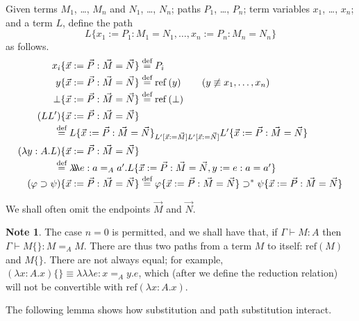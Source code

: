 \documentclass[a4paper,UKenglish]{lipics-v2016}
\newcommand*{\eqdef}{\mathrel{\smash{\stackrel{\text{def}}{=}}}}
\newcommand*{\reff}[1]{\ensuremath{\mathrm{ref} \left( {#1} \right)}}
\newcommand*{\triplelambda}{\ensuremath{\lambda \!\! \lambda \!\! \lambda}}
\theoremstyle{plain}
\theoremstyle{definition}
\newtheorem{note}[theorem]{Note}
\begin{document}
\begin{definition}
Given terms $M_1$, \ldots, $M_n$ and $N_1$, \ldots, $N_n$; paths $P_1$, \ldots, $P_n$; term variables $x_1$, \ldots, $x_n$; and a term $L$, define the path $$L \{ x_1 := P_1 : M_1 = N_1 , \ldots, x_n := P_n : M_n = N_n \}$$ as follows.
\begin{align*}
x_i \{ \vec{x} := \vec{P} : \vec{M} = \vec{N} \} & \eqdef P_i \\
y \{ \vec{x} := \vec{P} : \vec{M} = \vec{N} \} & \eqdef \reff{y} \qquad (y \not\equiv x_1, \ldots, x_n) \\
\bot \{ \vec{x} := \vec{P} : \vec{M} = \vec{N} \} & \eqdef \reff{\bot} \\
(LL') \{ \vec{x} := \vec{P} : \vec{M} = \vec{N} \} \\
\omit\rlap{\qquad \qquad $\eqdef L \{ \vec{x} := \vec{P} : \vec{M} = \vec{N} \}_{L' [\vec{x} := \vec{M}] L' [\vec{x} := \vec{N}]} L' \{ \vec{x} := \vec{P} : \vec{M} = \vec{N} \}$} \\
(\lambda y:A.L) \{ \vec{x} := \vec{P} : \vec{M} = \vec{N} \} & \\
\omit\rlap{\qquad\qquad $\eqdef \triplelambda e : a =_A a' . L \{ \vec{x} := \vec{P} : \vec{M} = \vec{N} , y := e : a = a' \}$} \\
(\varphi \supset \psi) \{ \vec{x} := \vec{P} : \vec{M} = \vec{N} \} & \eqdef \varphi \{ \vec{x} := \vec{P} : \vec{M} = \vec{N} \} \supset^* \psi \{ \vec{x} := \vec{P} : \vec{M} = \vec{N} \}
\end{align*}
\end{definition}

We shall often omit the endpoints $\vec{M}$ and $\vec{N}$.

\begin{note}
The case $n = 0$ is permitted, and we shall have that, if $\Gamma \vdash M : A$ then $\Gamma \vdash M \{\} : M =_A M$.  There are thus two paths from a term $M$ to itself: $\reff{M}$ and $M \{\}$.  There are not always equal; for example, $(\lambda x:A.x) \{\} \equiv \triplelambda e : x =_A y. e$, which (after we define the reduction relation) will not be convertible with $\reff{\lambda x:A.x}$.
\end{note}

The following lemma shows how substitution and path substitution interact.
\end{document}

